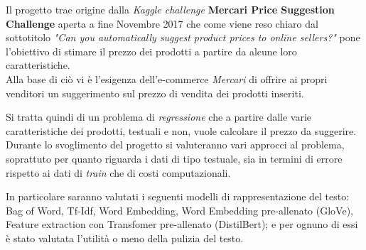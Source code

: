 



Il progetto trae origine dalla \textit{Kaggle challenge} \textbf{Mercari Price
Suggestion Challenge}\cite{mercari-price-suggestion-challenge} aperta a fine
Novembre 2017 che come viene reso chiaro dal sottotitolo \textit{"Can you
automatically suggest product prices to online sellers?"} pone l'obiettivo di
stimare il prezzo dei prodotti a partire da alcune loro caratteristiche. \\
Alla base di ciò vi è l'esigenza dell'e-commerce \textit{Mercari}\cite{mercari}
di offrire ai propri venditori un suggerimento sul prezzo di vendita dei
prodotti inseriti.

Si tratta quindi di un problema di \textit{regressione} che a partire dalle
varie caratteristiche dei prodotti, testuali e non, vuole calcolare il prezzo da
suggerire.
\\
Durante lo svoglimento del progetto si valuteranno vari approcci al problema,
soprattuto per quanto riguarda i dati di tipo testuale, sia in termini di errore
rispetto ai dati di \textit{train} che di costi computazionali.

In particolare saranno valutati i seguenti modelli di rappresentazione del
testo: Bag of Word, Tf-Idf, Word Embedding, Word Embedding pre-allenato (GloVe),
Feature extraction con Transfomer pre-allenato (DistilBert); e per ognuno di
essi è stato valutata l'utilità o meno della pulizia del testo.

